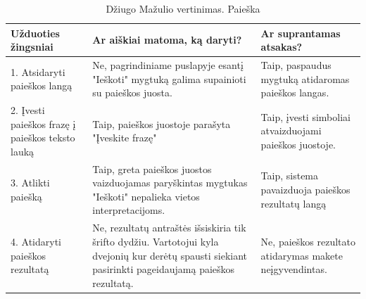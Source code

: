 \documentclass[oneside]{VUMIFPSkursinis}
\begin{document}
\begin{center}
\begin{longtable}[!htb]{|p{5cm}|p{5cm}|p{5cm}|}
	\caption{Džiugo Mažulio vertinimas. Paieška}
\endfirsthead
\endhead
	\hline
	Užduoties žingsniai & Ar aiškiai matoma, ką daryti? & Ar suprantamas atsakas? \\ \hline
	1. Atsidaryti paieškos langą & Ne, pagrindiniame puslapyje esantį "Ieškoti" mygtuką galima supainioti su paieškos juosta. & Taip, paspaudus mygtuką atidaromas paieškos langas. \\ \hline
	2. Įvesti paieškos frazę į paieškos teksto lauką & Taip, paieškos juostoje parašyta "Įveskite frazę" & Taip, įvesti simboliai atvaizduojami paieškos juostoje. \\ \hline
	3. Atlikti paiešką & Taip, greta paieškos juostos vaizduojamas paryškintas mygtukas "Ieškoti" nepalieka vietos interpretacijoms. & Taip, sistema pavaizduoja paieškos rezultatų langą \\ \hline
	4. Atidaryti paieškos rezultatą & Ne, rezultatų antraštės išsiskiria tik šrifto dydžiu. Vartotojui kyla dvejonių kur derėtų spausti siekiant pasirinkti pageidaujamą paieškos rezultatą. & Ne, paieškos rezultato atidarymas makete neįgyvendintas. \\ \hline
\end{longtable}
\end{center}
\end{document}
